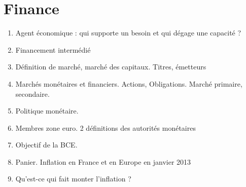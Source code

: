 \documentclass{article}
\begin{document}
\part{Finance}
\begin{enumerate}
\item Agent économique : qui supporte un besoin et qui dégage une capacité ?
\item Financement intermédié
\item Définition de marché, marché des capitaux. Titres, émetteurs
\item Marchés monétaires et financiers. Actions, Obligations. Marché primaire, secondaire.
\item Politique monétaire. 
\item Membres zone euro. 2 définitions des autorités monétaires
\item Objectif de la BCE.
\item Panier. Inflation en France et en Europe en janvier 2013
\item Qu'est-ce qui fait monter l'inflation ?
\end{enumerate}
\end{document}
